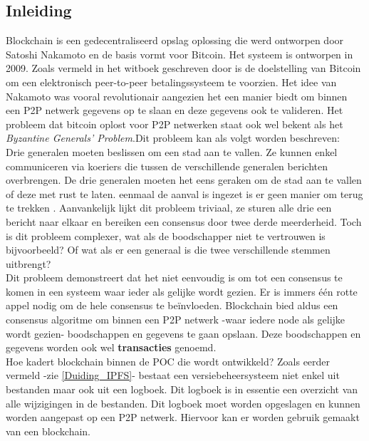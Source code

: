 \subsection{Inleiding}
Blockchain is een gedecentraliseerd opslag oplossing die werd ontworpen door  Satoshi Nakamoto en de basis vormt voor Bitcoin. Het systeem is ontworpen in 2009. Zoals vermeld in het witboek geschreven door \textcite{Satoshi2009} is de doelstelling van Bitcoin om een elektronisch peer-to-peer betalingssysteem te voorzien. Het idee van Nakamoto was vooral revolutionair aangezien het een manier biedt om binnen een P2P netwerk gegevens op te slaan en deze gegevens ook te valideren. Het probleem dat bitcoin oplost voor P2P netwerken staat ook wel bekent als het \textit{Byzantine Generals’ Problem}.Dit probleem kan als volgt worden beschreven:\\

Drie generalen moeten beslissen om een stad aan te vallen. Ze kunnen enkel communiceren via koeriers die tussen de verschillende generalen berichten overbrengen. De drie generalen moeten het eens geraken om de stad aan te vallen of deze met rust te laten. eenmaal de aanval is ingezet is er geen manier om terug te trekken \autocite{Peter2018}. Aanvankelijk lijkt dit probleem triviaal, ze sturen alle drie een bericht naar elkaar en bereiken een consensus door twee derde meerderheid. Toch is dit probleem complexer, wat als de boodschapper niet te vertrouwen is bijvoorbeeld? Of wat als er een generaal is die twee verschillende stemmen uitbrengt?\\

Dit probleem demonstreert dat het niet eenvoudig is om tot een consensus te komen in een systeem waar ieder als gelijke wordt gezien. Er is immers één rotte appel nodig om de hele consensus te beïnvloeden. Blockchain bied aldus een consensus algoritme om binnen een P2P netwerk -waar iedere node als gelijke wordt gezien- boodschappen en gegevens te gaan opslaan. Deze boodschappen en gegevens worden ook wel \textbf{transacties} genoemd.\\

Hoe kadert blockchain binnen de POC die wordt ontwikkeld? Zoals eerder vermeld -zie \ref{Duiding_IPFS}- bestaat een versiebeheersysteem niet enkel uit bestanden maar ook uit een logboek. Dit logboek is in essentie een overzicht van alle wijzigingen in de bestanden. Dit logboek moet worden opgeslagen en kunnen worden aangepast op een P2P netwerk. Hiervoor kan er worden gebruik gemaakt van een blockchain.\\

